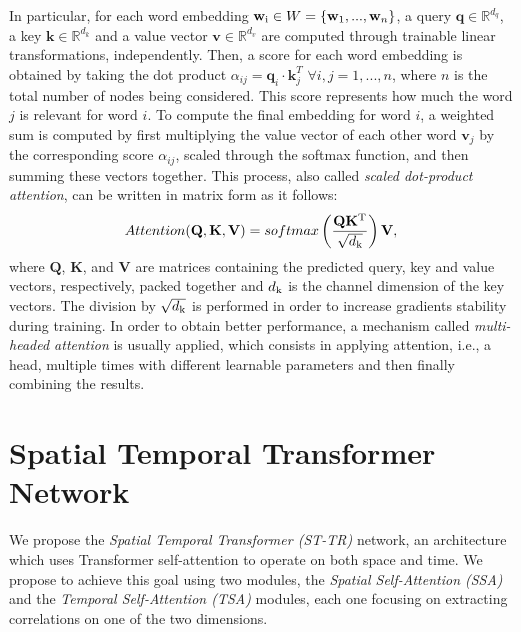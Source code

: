 \documentclass[times,twocolumn,final,authoryear]{elsarticle}
\begin{document}
In particular, for each word embedding $\mathbf{w}\textsubscript{i} \in W=\{\mathbf{w}_1,..., \mathbf{w}_n\}$, a query $\mathbf{q} \in \mathbb{R}^{d_q}$, a key $\mathbf{k} \in \mathbb{R}^{d_k}$ and a value vector $\mathbf{v} \in \mathbb{R}^{d_v}$ are computed through trainable linear transformations, independently. Then, a score for each word embedding is obtained by taking the dot product $\alpha_{ij} = \mathbf{q}_i \cdot {\mathbf{k}}^T_{j}$ $\forall i,j=1,...,n$, where $n$ is the total number of nodes being considered. This score represents how much the word $j$ is relevant for word $i$. To compute the final embedding for word $i$, a weighted sum is computed by first multiplying the value vector of each other word $\mathbf{v}_j$ by the corresponding score $\alpha_{ij}$, scaled through the softmax function, and then summing these vectors together. This process, also called \textit{scaled dot-product attention}, can be written in matrix form as it follows:
\begin{equation}
Attention(\mathbf{Q}, \mathbf{K}, \mathbf{V})=softmax \left(\frac{\mathbf{QK}\textsuperscript{T}}{\sqrt{d\textsubscript{k}}} \right)\mathbf{V},
\end{equation}
where $\mathbf{Q}$, $\mathbf{K}$, and $\mathbf{V}$ are matrices containing the predicted query, key and value vectors, respectively, packed together and $d\textsubscript{k}$ is the channel dimension of the key vectors. The division by $\sqrt{d\textsubscript{k}}$ is performed in order to increase gradients stability during training. In order to obtain better performance, a mechanism called \textit{multi-headed attention} is usually applied, which consists in applying attention, i.e., a head, multiple times with different learnable parameters and then finally combining the results.





\section{Spatial Temporal Transformer Network}

We propose the \textit{Spatial Temporal Transformer (ST-TR)} network, an architecture which uses Transformer self-attention to operate on both space and time. We propose to achieve this goal using two modules, the \textit{Spatial Self-Attention (SSA)} and the \textit{Temporal Self-Attention (TSA)} modules, each one focusing on extracting correlations on one of the two dimensions. 
\end{document}

